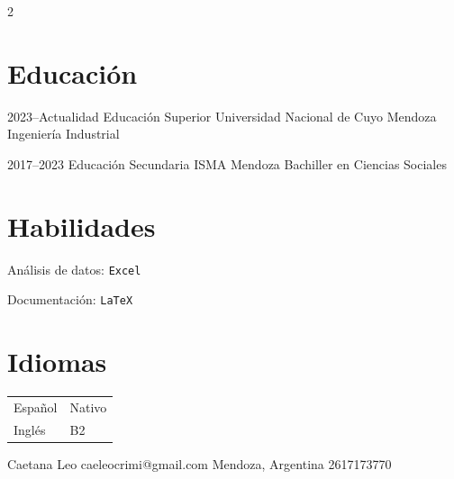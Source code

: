\documentclass[lighthipster]{simplehipstercv}
\newlength{\rightcolwidth}
\begin{document}
\begin{paracol}{2}
\section*{Educación}

\cvevent
{2023--Actualidad}
{Educación Superior}
{Universidad Nacional de Cuyo}
{Mendoza}
{Ingeniería Industrial}{}

\vspace{0.5em}




\cvevent
{2017--2023}
{Educación Secundaria}
{ISMA}
{Mendoza}
{Bachiller en Ciencias Sociales}{}

\section*{Habilidades}

Análisis de datos: \texttt{Excel}

Documentación: \texttt{LaTeX}

\vspace{2em}

\section*{Idiomas}

\begin{tabular}{l l}
Español & Nativo \\
Inglés & B2 \\
\end{tabular}

\vfill

\setlength{\parindent}{0pt}
\begin{minipage}[t]{\rightcolwidth}
\begin{center}
{\small Caetana Leo  caeleocrimi@gmail.com 
 Mendoza, Argentina 
 2617173770}
\end{center}
\end{minipage}

\end{paracol}
\end{document}
